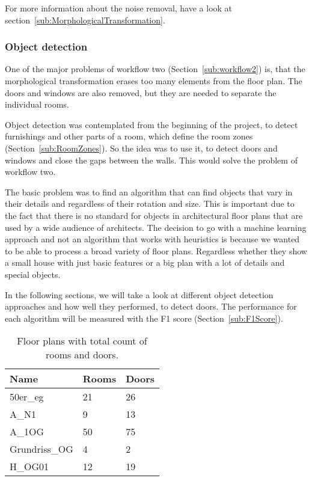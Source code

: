 For more information about the noise removal, have a look at section~\ref{sub:MorphologicalTransformation}.

\subsubsection{Object detection}
One of the major problems of workflow two (Section~\ref{sub:workflow2}) is, that the morphological transformation erases too many elements from the floor plan. The doors and windows are also removed, but they are needed to separate the individual rooms.

Object detection was contemplated from the beginning of the project, to detect furnishings and other parts of a room, which define the room zones (Section~\ref{sub:RoomZones}). So the idea was to use it, to detect doors and windows and close the gaps between the walls. This would solve the problem of workflow two.

The basic problem was to find an algorithm that can find objects that vary in their details and regardless of their rotation and size. This is important due to the fact that there is no standard for objects in architectural floor plans that are used by a wide audience of architects. The decision to go with a machine learning approach and not an algorithm that works with heuristics is because we wanted to be able to process a broad variety of floor plans. Regardless whether they show a small house with just basic features or a big plan with a lot of details and special objects.

In the following sections, we will take a look at different object detection approaches and how well they performed, to detect doors. The performance for each algorithm will be measured with the F1 score (Section~\ref{sub:F1Score}).

\begin{table}[H]
\centering
\caption{Floor plans with total count of rooms and doors.}
\label{tbl:FloorPlanData}
\begin{tabular}{@{}lll@{}}
\toprule
Name          & Rooms & Doors \\ \midrule
50er\_eg      & 21    & 26    \\
A\_N1         & 9     & 13    \\
A\_1OG        & 50    & 75    \\
Grundriss\_OG & 4     & 2     \\
H\_OG01       & 12    & 19    \\ \bottomrule
\end{tabular}
\end{table}

